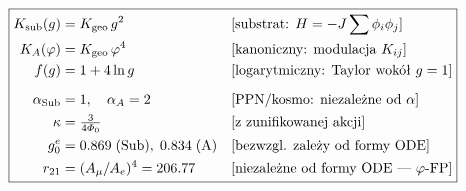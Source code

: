 \begin{equation}\label{eq:dictionary-key}
\boxed{
\begin{aligned}
  K_{\mathrm{sub}}(g) &= K_{\mathrm{geo}}\,g^2
  & &\text{[substrat: } H = -J\sum \phi_i\phi_j]\\
  K_A(\varphi) &= K_{\mathrm{geo}}\,\varphi^4
  & &\text{[kanoniczny: modulacja } K_{ij}]\\
  f(g) &= 1 + 4\ln g
  & &\text{[logarytmiczny: Taylor wokół } g=1]\\[6pt]
  \alpha_{\mathrm{Sub}} &= 1, \quad \alpha_A = 2
  & &\text{[PPN/kosmo: niezależne od $\alpha$]}\\
  \kappa &= \tfrac{3}{4\varPhi_0}
  & &\text{[z zunifikowanej akcji]}\\
  g_0^e &= 0.869\;\text{(Sub)},\; 0.834\;\text{(A)}
  & &\text{[bezwzgl. zależy od formy ODE]}\\
  r_{21} &= (A_\mu/A_e)^4 = 206.77
  & &\text{[niezależne od formy ODE — $\varphi$-FP]}
\end{aligned}
}
\end{equation}
